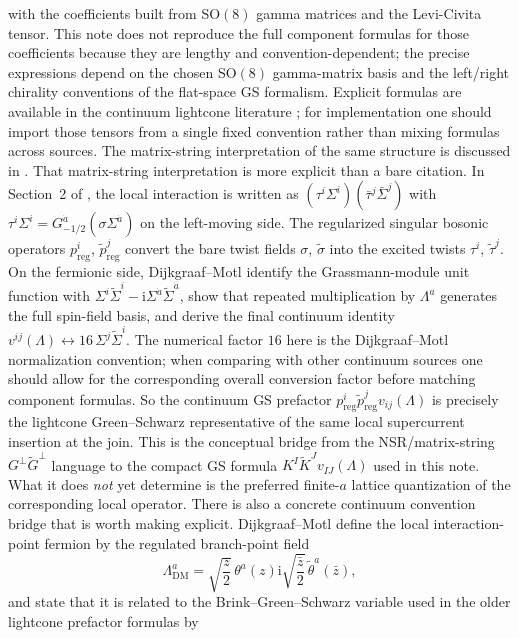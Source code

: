 \documentclass[11pt]{article}
\numberwithin{equation}{section}
\newcommand{\ii}{\mathrm{i}}
\begin{document}
with the coefficients built from SO$(8)$ gamma matrices and the Levi-Civita tensor. This note does not reproduce the full component formulas for those coefficients because they are lengthy and convention-dependent; the precise expressions depend on the chosen SO$(8)$ gamma-matrix basis and the left/right chirality conventions of the flat-space GS formalism. Explicit formulas are available in the continuum lightcone literature \cite{SpradlinVolovich2002,PankiewiczStefanski2002}; for implementation one should import those tensors from a single fixed convention rather than mixing formulas across sources. The matrix-string interpretation of the same structure is discussed in \cite{DijkgraafMotl2003,Kishimoto2006}.
That matrix-string interpretation is more explicit than a bare citation. In Section~2 of \cite{DijkgraafMotl2003}, the local interaction is written as $(\tau^i\Sigma^i)(\bar\tau^j\bar\Sigma^j)$ with $\tau^i\Sigma^i=G_{-1/2}^{\dot a}(\sigma\Sigma^{\dot a})$ on the left-moving side. The regularized singular bosonic operators $p^i_{\mathrm{reg}}$, $\tilde p^j_{\mathrm{reg}}$ convert the bare twist fields $\sigma$, $\tilde\sigma$ into the excited twists $\tau^i$, $\tilde\tau^j$. On the fermionic side, Dijkgraaf--Motl identify the Grassmann-module unit function with $\Sigma^i\tilde\Sigma^i-\ii\Sigma^{\dot a}\tilde\Sigma^{\dot a}$, show that repeated multiplication by $\Lambda^a$ generates the full spin-field basis, and derive the final continuum identity $v^{ij}(\Lambda)\leftrightarrow 16\,\Sigma^j\tilde\Sigma^i$. The numerical factor $16$ here is the Dijkgraaf--Motl normalization convention; when comparing with other continuum sources one should allow for the corresponding overall conversion factor before matching component formulas. So the continuum GS prefactor $p^i_{\mathrm{reg}}\tilde p^j_{\mathrm{reg}}v_{ij}(\Lambda)$ is precisely the lightcone Green--Schwarz representative of the same local supercurrent insertion at the join. This is the conceptual bridge from the NSR/matrix-string $G^\perp\widetilde G^\perp$ language to the compact GS formula $K^I\widetilde K^Jv_{IJ}(\Lambda)$ used in this note. What it does \emph{not} yet determine is the preferred finite-$a$ lattice quantization of the corresponding local operator.
There is also a concrete continuum convention bridge that is worth making explicit. Dijkgraaf--Motl define the local interaction-point fermion by the regulated branch-point field
\[
\Lambda^a_{\mathrm{DM}}
=
\sqrt{\frac z2}\,\theta^a(z)
\ii\sqrt{\frac{\bar z}2}\,\tilde\theta^a(\bar z),
\]
and state that it is related to the Brink--Green--Schwarz variable used in the older lightcone prefactor formulas by
\end{document}
